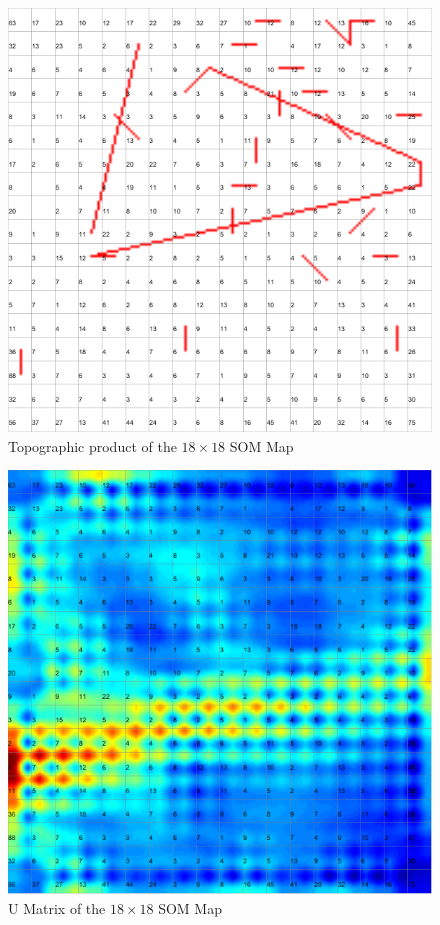 \documentclass{acm_proc_article-sp}
\begin{document}
\begin{figure}
\centering
\includegraphics[width=\linewidth]{img/wine-mid-radius-neighbourhood-graph}
\caption{Topographic product of the $18\times18$ SOM Map}
\label{fig:wine-mid-radius-neighbourhood-graph}
\end{figure}

\begin{figure}
\centering
\includegraphics[width=\linewidth]{img/wine-mid-u-matrix}
\caption{U Matrix of the $18\times18$ SOM Map}
\label{fig:wine-mid-u-matrix}
\end{figure}
\end{document}
